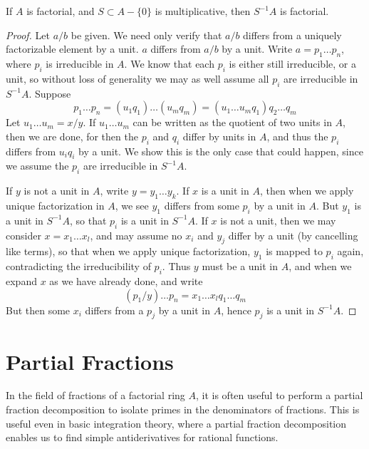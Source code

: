 \begin{theorem}
    If $A$ is factorial, and $S \subset A - \{ 0 \}$ is multiplicative, then $S^{-1}A$ is factorial.
\end{theorem}
\begin{proof}
    Let $a/b$ be given. We need only verify that $a/b$ differs from a uniquely factorizable element by a unit. $a$ differs from $a/b$ by a unit. Write $a = p_1 \dots p_n$, where $p_i$ is irreducible in $A$. We know that each $p_i$ is either still irreducible, or a unit, so without loss of generality we may as well assume all $p_i$ are irreducible in $S^{-1}A$. Suppose
    \[ p_1 \dots p_n = (u_1 q_1) \dots (u_m q_m) = (u_1 \dots u_m q_1) q_2 \dots q_m \]
    Let $u_1 \dots u_m = x/y$. If $u_1 \dots u_m$ can be written as the quotient of two units in $A$, then we are done, for then the $p_i$ and $q_i$ differ by units in $A$, and thus the $p_i$ differs from $u_i q_i$ by a unit. We show this is the only case that could happen, since we assume the $p_i$ are irreducible in $S^{-1}A$.

    If $y$ is not a unit in $A$, write $y = y_1 \dots y_k$. If $x$ is a unit in $A$, then when we apply unique factorization in $A$, we see $y_1$ differs from some $p_i$ by a unit in $A$. But $y_1$ is a unit in $S^{-1}A$, so that $p_i$ is a unit in $S^{-1}A$. If $x$ is not a unit, then we may consider $x = x_1 \dots x_{l}$, and may assume no $x_i$ and $y_j$ differ by a unit (by cancelling like terms), so that when we apply unique factorization, $y_1$ is mapped to $p_i$ again, contradicting the irreducibility of $p_i$. Thus $y$ must be a unit in $A$, and when we expand $x$ as we have already done, and write
    \[ (p_1/y) \dots p_n = x_1 \dots x_{l} q_1 \dots q_m \]
    But then some $x_i$ differs from a $p_j$ by a unit in $A$, hence $p_j$ is a unit in $S^{-1}A$.
\end{proof}

\section{Partial Fractions}

In the field of fractions of a factorial ring $A$, it is often useful to perform a partial fraction decomposition to isolate primes in the denominators of fractions. This is useful even in basic integration theory, where a partial fraction decomposition enables us to find simple antiderivatives for rational functions.

